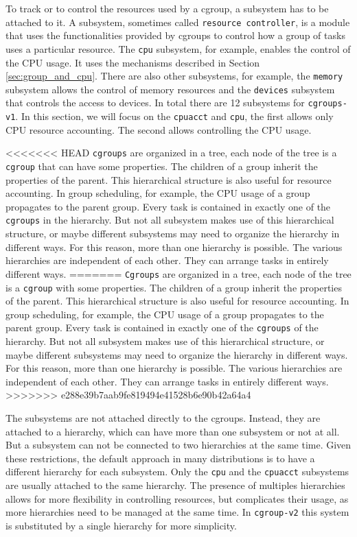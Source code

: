 To track or to control the resources used by a cgroup, a subsystem has to be attached to it. A subsystem, sometimes called \verb|resource controller|, is a module that uses the functionalities provided by cgroups to control how a group of tasks uses a particular resource. The \verb|cpu| subsystem, for example, enables the control of the CPU usage. It uses the mechanisms described in Section \ref{sec:group_and_cpu}. There are also other subsystems, for example, the \verb|memory| subsystem allows the control of memory resources and the \verb|devices| subsystem that controls the access to devices. In total there are 12 subsystems for \verb|cgroups-v1|. In this section, we will focus on the \verb|cpuacct| and \verb|cpu|, the first allows only CPU resource accounting. The second allows controlling the CPU usage.

<<<<<<< HEAD
\verb|cgroups| are organized in a tree, each node of the tree is a \verb|cgroup| that can have some properties. The children of a group inherit the properties of the parent. This hierarchical structure is also useful for resource accounting. In group scheduling, for example, the CPU usage of a group propagates to the parent group. Every task is contained in exactly one of the \verb|cgroups| in the hierarchy. But not all subsystem makes use of this hierarchical structure, or maybe different subsystems may need to organize the hierarchy in different ways. For this reason, more than one hierarchy is possible. The various hierarchies are independent of each other. They can arrange tasks in entirely different ways.
=======
\verb|Cgroups| are organized in a tree, each node of the tree is a \verb|cgroup| with some properties. The children of a group inherit the properties of the parent. This hierarchical structure is also useful for resource accounting. In group scheduling, for example, the CPU usage of a group propagates to the parent group. Every task is contained in exactly one of the \verb|cgroups| of the hierarchy. But not all subsystem makes use of this hierarchical structure, or maybe different subsystems may need to organize the hierarchy in different ways. For this reason, more than one hierarchy is possible. The various hierarchies are independent of each other. They can arrange tasks in entirely different ways.
>>>>>>> e288e39b7aab9fe819494e41528b6e90b42a64a4

The subsystems are not attached directly to the cgroups. Instead, they are attached to a hierarchy, which can have more than one subsystem or not at all. But a subsystem can not be connected to two hierarchies at the same time. Given these restrictions, the default approach in many distributions is to have a different hierarchy for each subsystem. Only the \verb|cpu| and the \verb|cpuacct| subsystems are usually attached to the same hierarchy. The presence of multiples hierarchies allows for more flexibility in controlling resources, but complicates their usage, as more hierarchies need to be managed at the same time. In \verb|cgroup-v2| this system is substituted by a single hierarchy for more simplicity.

